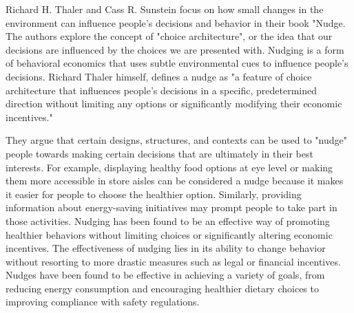 Richard H. Thaler and Cass R. Sunstein focus on how small changes in the environment can influence people's decisions and behavior in their book "Nudge. The authors explore the concept of "choice architecture", or the idea that our decisions are influenced by the choices we are presented with. Nudging is a form of behavioral economics that uses subtle environmental cues to influence people's decisions. Richard Thaler himself, defines a nudge as "a feature of choice architecture that influences people's decisions in a specific, predetermined direction without limiting any options or significantly modifying their economic incentives." \cite[p.14]{Thaler2008}

They argue that certain designs, structures, and contexts can be used to "nudge" people towards making certain decisions that are ultimately in their best interests. For example, displaying healthy food options at eye level or making them more accessible in store aisles can be considered a nudge because it makes it easier for people to choose the healthier option. Similarly, providing information about energy-saving initiatives may prompt people to take part in those activities. Nudging has been found to be an effective way of promoting healthier behaviors without limiting choices or significantly altering economic incentives. The effectiveness of nudging lies in its ability to change behavior without resorting to more drastic measures such as legal or financial incentives. Nudges have been found to be effective in achieving a variety of goals, from reducing energy consumption and encouraging healthier dietary choices to improving compliance with safety regulations. \cite{Thaler2008}


